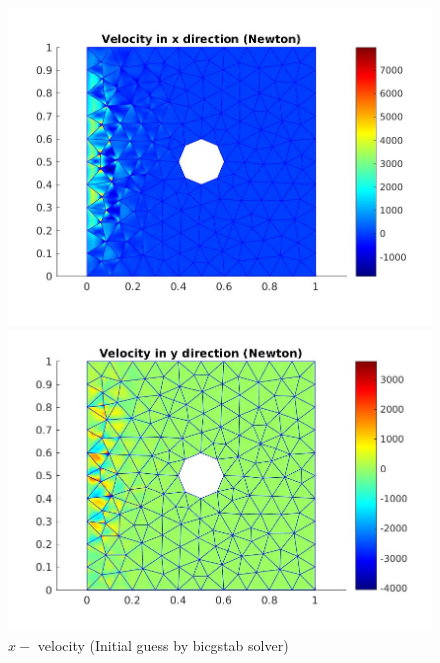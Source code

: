 \documentclass[a4paper]{book}
\begin{document}
\begin{figure}
  \begin{minipage}[c]{0.67\textwidth}
    \includegraphics[width=\textwidth]{cylinder_newton_vx_bicgstab.jpg}
  \end{minipage}\hfill
  \begin{minipage}[c]{0.3\textwidth}
    \caption{$x-$ velocity (Initial guess by bicgstab solver)}
  \label{x_vel_navier_stoke_bicgstab}
  \end{minipage}
  \begin{minipage}[c]{0.67\textwidth}
    \includegraphics[width=\textwidth]{cylinder_newton_vy_bicgstab.jpg}
  \end{minipage}\hfill
  \begin{minipage}[c]{0.3\textwidth}

\end{minipage}
\end{figure}
\end{document}
